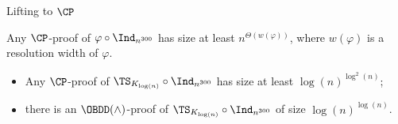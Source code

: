 \begin{frame}{Lifting to $\CP$}
    
    \begin{theorem}
        Any $\CP$-proof of $\varphi \circ \Ind_{n^{300}}$ has size at least $n^{\Theta(w(\varphi))}$,
        where $w(\varphi)$ is a resolution width of $\varphi$.
    \end{theorem}

    \begin{corollary}
        \begin{itemize}
            \item Any $\CP$-proof of $\TS_{K_{\log (n)}} \circ \Ind_{n^{300}}$ has size at least
                $\log(n)^{\log^2(n)}$;
            \item there is an $\OBDD(\land)$-proof of $\TS_{K_{\log (n)}} \circ \Ind_{n^{300}}$ of size
                $\log(n)^{\log(n)}$.
        \end{itemize}
        
    \end{corollary}
    
\end{frame}
